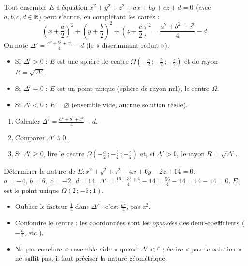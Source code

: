 \documentclass[11pt]{article}
\newcommand{\cle}[1]{{\popxbold\color{popdark}#1}}
\begin{document}
\begin{propriete}
Tout ensemble $E$ d'équation $x^2+y^2+z^2+ax+by+cz+d=0$ (avec $a,b,c,d \in \mathbb{R}$) peut s'écrire, en complétant les carrés :
\[ \left(x+\frac{a}{2}\right)^2 + \left(y+\frac{b}{2}\right)^2 + \left(z+\frac{c}{2}\right)^2 = \frac{a^2+b^2+c^2}{4} - d. \]
On note $\Delta' = \frac{a^2+b^2+c^2}{4} - d$ (le « discriminant réduit »).
\begin{itemize}
\item Si $\Delta' > 0$ : $E$ est une \cle{sphère} de centre $\Omega\left(-\frac{a}{2}\,;-\frac{b}{2}\,;-\frac{c}{2}\right)$ et de rayon $R=\sqrt{\Delta'}$.
\item Si $\Delta' = 0$ : $E$ est un \cle{point unique} (sphère de rayon nul), le centre $\Omega$.
\item Si $\Delta' < 0$ : $E = \varnothing$ (ensemble vide, aucune solution réelle).
\end{itemize}
\end{propriete}

\begin{methode}
\begin{enumerate}
\item Calculer $\Delta' = \frac{a^2+b^2+c^2}{4} - d$.
\item Comparer $\Delta'$ à $0$.
\item Si $\Delta' \ge 0$, lire le centre $\Omega\left(-\frac{a}{2}\,;-\frac{b}{2}\,;-\frac{c}{2}\right)$ et, si $\Delta'>0$, le rayon $R=\sqrt{\Delta'}$.
\end{enumerate}
\end{methode}

\begin{exemplebox}
Déterminer la nature de $E : x^2+y^2+z^2-4x+6y-2z+14=0$.
$a=-4,\; b=6,\; c=-2,\; d=14$.
$\Delta' = \frac{16+36+4}{4} - 14 = \frac{56}{4} - 14 = 14-14=0$.
$E$ est le point unique $\Omega(2\,;-3\,;1)$.
\end{exemplebox}

\begin{attention}
\begin{itemize}
\item Oublier le facteur $\frac{1}{4}$ dans $\Delta'$ : c'est $\frac{a^2}{4}$, pas $a^2$.
\item Confondre le centre : les coordonnées sont les \emph{opposées} des demi-coefficients ($-\frac{a}{2}$, etc.).
\item Ne pas conclure « ensemble vide » quand $\Delta'<0$ ; écrire « pas de solution » ne suffit pas, il faut préciser la nature géométrique.
\end{itemize}
\end{attention}
\end{document}
